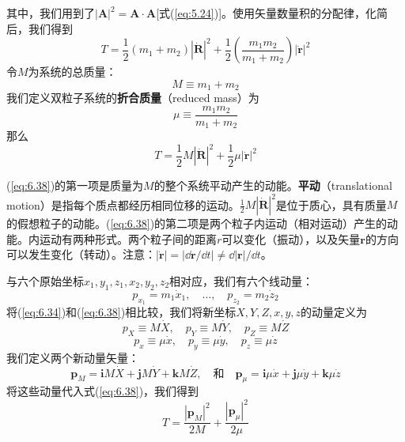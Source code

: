     其中，我们用到了$\left|\mathbf{A}\right|^2 = \mathbf{A}\cdot \mathbf{A}$[式(\ref{eq:5.24})]。使用矢量数量积的分配律，化简后，我们得到
    \begin{equation}
        T = \frac{1}{2}\left(m_1 + m_2\right)\left|\dot{\mathbf{R}}\right|^2 + \frac{1}{2}\left(\frac{m_1m_2}{m_1+m_2}\right)\left|\dot{\mathbf{r}}\right|^2
        \label{eq:6.35}
    \end{equation}
    令$M$为系统的总质量：
    \begin{equation}
        M \equiv m_1 + m_2
        \label{eq:6.36}
    \end{equation}
    我们定义双粒子系统的\textbf{折合质量}（reduced mass）为
    \begin{equation}
        \boxed{
            \mu \equiv \frac{m_1m_2}{m_1+m_2}
        }
        \label{eq:6.37}
    \end{equation}
    那么
    \begin{equation}
        T = \frac{1}{2}M\left|\dot{\mathbf{R}}\right|^2 + \frac{1}{2}\mu\left|\dot{\mathbf{r}}\right|^2
        \label{eq:6.38}
    \end{equation}

    (\ref{eq:6.38})的第一项是质量为$M$的整个系统平动产生的动能。\textbf{平动}（translational motion）是指每个质点都经历相同位移的运动。$\frac{1}{2}M\left|\dot{\mathbf{R}}\right|^2$是位于质心，具有质量$M$的假想粒子的动能。(\ref{eq:6.38})的第二项是两个粒子内运动（相对运动）产生的动能。内运动有两种形式。两个粒子间的距离$r$可以变化（振动），以及矢量$\mathbf{r}$的方向可以发生变化（转动）。注意：$\left|\dot{\mathbf{r}}\right| = \left|\dd \mathbf{r}/\dd t\right| \neq \dd \left|\mathbf{r}\right|/\dd t$。

    与六个原始坐标$x_1,y_1,z_1,x_2,y_2,z_2$相对应，我们有六个线动量：
    \begin{equation}
        p_{x_1} = m_1\dot{x}_1, \quad \ldots, \quad p_{z_2} = m_2\dot{z}_2
        \label{eq:6.39}
    \end{equation}
    将(\ref{eq:6.34})和(\ref{eq:6.38})相比较，我们将新坐标$X,Y,Z,x,y,z$的动量定义为
    \begin{equation*}
        p_X \equiv M\dot{X}, \quad p_Y \equiv M\dot{Y}, \quad p_Z \equiv M\dot{Z}
    \end{equation*}
    \begin{equation*}
        p_x \equiv \mu\dot{x}, \quad p_y \equiv \mu\dot{y}, \quad p_z \equiv \mu\dot{z}
    \end{equation*}
    我们定义两个新动量矢量：
    \begin{equation*}
        \mathbf{p}_M = \mathbf{i}M\dot{X} + \mathbf{j}M\dot{Y} + \mathbf{k}M\dot{Z},
        \quad \text{和} \quad \mathbf{p}_{\mu} = \mathbf{i}\mu\dot{x} + \mathbf{j}\mu\dot{y} + \mathbf{k}\mu\dot{z}
    \end{equation*}
    将这些动量代入式(\ref{eq:6.38})，我们得到
    \begin{equation}
        T = \frac{\left|\mathbf{p}_M\right|^2}{2M} + \frac{\left|\mathbf{p}_{\mu}\right|^2}{2\mu}
        \label{eq:6.40}
    \end{equation}

